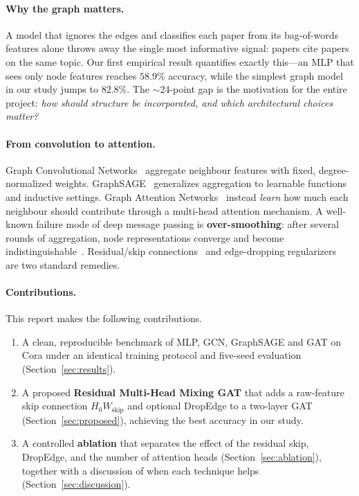 \documentclass{article}
\begin{document}
\paragraph{Why the graph matters.}
A model that ignores the edges and classifies each paper from its bag-of-words
features alone throws away the single most informative signal: papers cite papers on
the same topic. Our first empirical result quantifies exactly this---an MLP that sees
only node features reaches $58.9\%$ accuracy, while the simplest graph model in our
study jumps to $82.8\%$. The $\sim$24-point gap is the motivation for the entire
project: \emph{how should structure be incorporated, and which architectural choices
matter?}

\paragraph{From convolution to attention.}
Graph Convolutional Networks~\cite{kipf2017gcn} aggregate neighbour features with
fixed, degree-normalized weights. GraphSAGE~\cite{hamilton2017graphsage} generalizes
aggregation to learnable functions and inductive settings. Graph Attention
Networks~\cite{velickovic2018gat} instead \emph{learn} how much each neighbour should
contribute through a multi-head attention mechanism. A well-known failure mode of
deep message passing is \textbf{over-smoothing}: after several rounds of aggregation,
node representations converge and become indistinguishable~\cite{li2018deeper,
oono2020oversmoothing}. Residual/skip connections~\cite{he2016resnet,xu2018jknet} and
edge-dropping regularizers~\cite{rong2020dropedge} are two standard remedies.

\paragraph{Contributions.}
This report makes the following contributions.
\begin{enumerate}
  \item A clean, reproducible benchmark of MLP, GCN, GraphSAGE and GAT on Cora under
        an identical training protocol and five-seed evaluation
        (Section~\ref{sec:results}).
  \item A proposed \textbf{Residual Multi-Head Mixing GAT} that adds a raw-feature
        skip connection $H_0 W_{\text{skip}}$ and optional DropEdge to a two-layer
        GAT (Section~\ref{sec:proposed}), achieving the best accuracy in our study.
  \item A controlled \textbf{ablation} that separates the effect of the residual
        skip, DropEdge, and the number of attention heads
        (Section~\ref{sec:ablation}), together with a discussion of when each
        technique helps (Section~\ref{sec:discussion}).
\end{enumerate}
\end{document}
